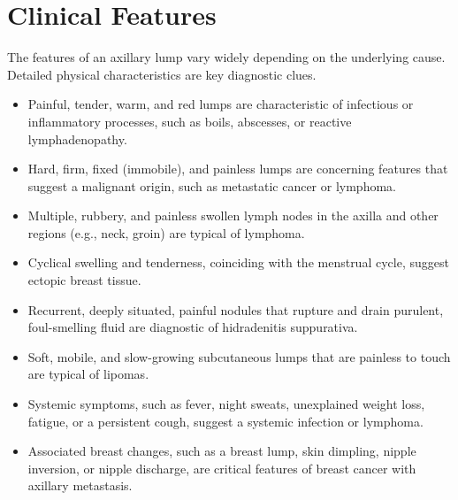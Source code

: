 \section*{Clinical Features}
The features of an axillary lump vary widely depending on the underlying cause. Detailed physical characteristics are key diagnostic clues.
\begin{itemize}
    \item Painful, tender, warm, and red lumps are characteristic of infectious or inflammatory processes, such as boils, abscesses, or reactive lymphadenopathy.
    \item Hard, firm, fixed (immobile), and painless lumps are concerning features that suggest a malignant origin, such as metastatic cancer or lymphoma.
    \item Multiple, rubbery, and painless swollen lymph nodes in the axilla and other regions (e.g., neck, groin) are typical of lymphoma.
    \item Cyclical swelling and tenderness, coinciding with the menstrual cycle, suggest ectopic breast tissue.
    \item Recurrent, deeply situated, painful nodules that rupture and drain purulent, foul-smelling fluid are diagnostic of hidradenitis suppurativa.
    \item Soft, mobile, and slow-growing subcutaneous lumps that are painless to touch are typical of lipomas.
    \item Systemic symptoms, such as fever, night sweats, unexplained weight loss, fatigue, or a persistent cough, suggest a systemic infection or lymphoma.
    \item Associated breast changes, such as a breast lump, skin dimpling, nipple inversion, or nipple discharge, are critical features of breast cancer with axillary metastasis.
\end{itemize}

